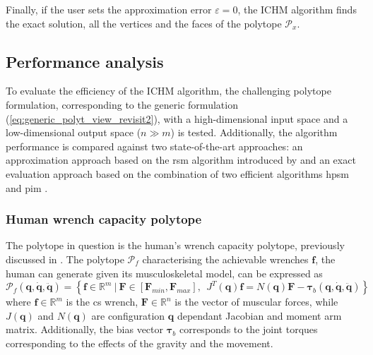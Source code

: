 Finally, if the user sets the approximation error $\varepsilon\!=\!0$, the ICHM algorithm finds the exact solution, all the vertices and the faces of the polytope $\mathcal{P}_x$.

\subsection{Performance analysis}
\label{ch:chm_performance}

To evaluate the efficiency of the ICHM algorithm, the challenging polytope formulation, corresponding to the generic formulation (\ref{eq:generic_polyt_view_revisit2}), with a high-dimensional input space and a low-dimensional output space ($n\gg m$) is tested. Additionally, the algorithm performance is compared against two state-of-the-art approaches: an approximation approach based on the \gls{rsm} algorithm introduced by \citet{carmichael_towards_2011} and an exact evaluation approach based on the combination of two efficient algorithms \gls{hpsm} \cite{hyper_psm} and \gls{pim} \cite{bremner_fukuda_marzetta_1998}.

\subsubsection{Human wrench capacity polytope}
The polytope in question is the human's wrench capacity polytope, previously discussed in . The polytope $\mathcal{P}_f$ characterising the achievable wrenches $\bm{f}$, the human can generate given its musculoskeletal model, can be expressed as 
\begin{equation}
    \mathcal{P}_f(\bm{q},\dot{\bm{q}},\ddot{\bm{q}}) = \left\{ \bm{f} \in \mathbb{R}^m ~|~ \bm{F}\in\left[\bm{F}_{min}, \bm{F}_{max} \right], ~~ \!J^T(\bm{q})\bm{f} =\! N(\bm{q})\bm{F} -\bm{\tau}_b(\bm{q},\dot{\bm{q}},\ddot{\bm{q}}) \right\}
    \label{eq:human_force_poly_revisit2}
\end{equation}
where $\bm{f}\in\mathbb{R}^m$ is the \gls{cs} wrench, $\bm{F}\in\mathbb{R}^n$ is the vector of muscular forces, while $J(\bm{q})$ and $N(\bm{q})$ are configuration $\bm{q}$ dependant Jacobian and moment arm matrix. Additionally, the bias vector $\bm{\tau}_b$ corresponds to the joint torques corresponding to the effects of the gravity and the movement. 

